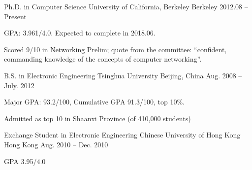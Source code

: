 

\begin{cventries}

  \cventry
  {Ph.D. in Computer Science}
  {University of California, Berkeley}
  {Berkeley}
  {2012.08 -- Present}
  {
    \begin{cvitems}
    \item GPA: 3.961/4.0. Expected to complete in 2018.06.
    \item Scored 9/10 in Networking Prelim; quote from the committee:
      ``confident, commanding knowledge of the concepts of computer
      networking''.
    \end{cvitems}
  }

  \cventry
  {B.S. in Electronic Engineering}
  {Tsinghua University}
  {Beijing, China}
  {Aug. 2008 -- July. 2012}
  {
    \begin{cvitems}
    \item{Major GPA: 93.2/100, Cumulative GPA 91.3/100, top 10\%.}
    \item{Admitted as top 10 in Shaanxi Province (of 410,000 students)}
    \end{cvitems}
  }

  \cventry
  {Exchange Student in Electronic Engineering}
  {Chinese University of Hong Kong}
  {Hong Kong}
  {Aug. 2010 -- Dec. 2010}
  {
    \begin{cvitems}
    \item {GPA 3.95/4.0}
    \end{cvitems}
  }

\end{cventries}

